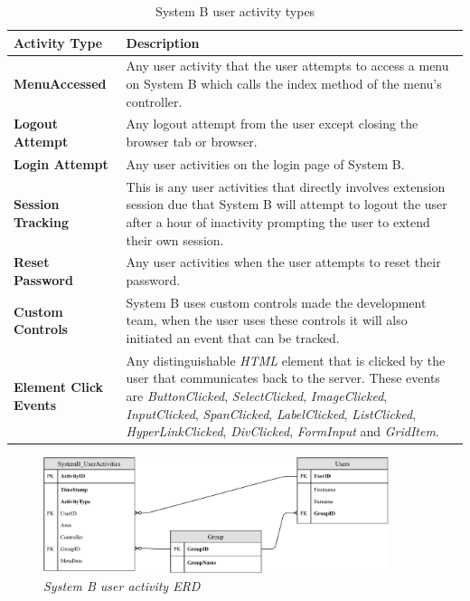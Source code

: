 \begin{table}[!htb]
	\centering
	\small
	\caption[System B user activity types]
	{System B user activity types}
	\label{tbl:Ch2_SystemB_ActivityTypes}
	\begin{tabularx}{\textwidth}{|l|X|}
		\hline \textbf{Activity Type} & \textbf{Description} \\
		\hline \textbf{MenuAccessed} & Any user activity that the user attempts to access a menu on System B which calls the index method of the menu's controller. \\
		\hline \textbf{Logout Attempt} & Any logout attempt from the user except closing the browser tab or browser. \\
		\hline \textbf{Login Attempt} & Any user activities on the login page of System B.\\
		\hline \textbf{Session Tracking} & This is any user activities that directly involves extension session due that System B will attempt to logout the user after a hour of inactivity prompting the user to extend their own session.\\
		\hline \textbf{Reset Password} & Any user activities when the user attempts to reset their password. \\
		\hline \textbf{Custom Controls} & System B uses custom controls made the development team, when the user uses these controls it will also initiated an event that can be tracked. \\ 
		\hline \textbf{Element Click Events} & Any distinguishable \emph{HTML} element that is clicked by the user that communicates back to the server. These events are \emph{ButtonClicked}, \emph{SelectClicked}, \emph{ImageClicked}, \emph{InputClicked}, \emph{SpanClicked}, \emph{LabelClicked}, \emph{ListClicked}, \emph{HyperLinkClicked}, \emph{DivClicked}, \emph{FormInput} and \emph{GridItem}.\\
		\hline
	\end{tabularx}
\end{table}

\begin{figure}[!htb] %
	\centering %
	\includegraphics[width=0.9\textwidth]{Images/Chapter2/SystemB_ERD_Basic/SystemB_ERD_Basic.pdf}
	\caption[System B user activity ERD]
	{\textit{System B user activity ERD}}\label{fig:ch2_SystemB_Basic_ERD}
\end{figure}

